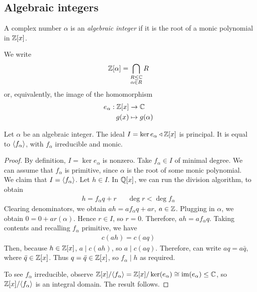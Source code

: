 \documentclass{../template/note}
\begin{document}
    \subsection{Algebraic integers}

    \begin{definition}
        A complex number $\alpha$ is an \emph{algebraic integer} if it is the root of a monic polynomial in $\mathbb Z[x]$.
    \end{definition}
    
    We write
    \begin{align*}
        \mathbb Z[\alpha] = \bigcap_{\substack{R \leq \mathbb C \\ \alpha \in R}} R
    \end{align*}
    or, equivalently, the image of the homomorphism
    \begin{align*}
        e_\alpha: \mathbb Z[x] &\to \mathbb C \\
        g(x) &\mapsto g(\alpha)
    \end{align*}
    
    \begin{proposition}
        Let $\alpha$ be an algebraic integer. The ideal $I = \ker e_\alpha \triangleleft \mathbb Z[x]$ is principal. It is equal to $\left \langle f_\alpha \right \rangle$, with $f_\alpha$ irreducible and monic.
    \end{proposition}
    
    \begin{proof}
        By definition, $I = \ker e_\alpha$ is nonzero. Take $f_\alpha \in I$ of minimal degree. We can assume that $f_\alpha$ is primitive, since $\alpha$ is the root of some monic polynomial. We claim that $I=\left \langle f_\alpha \right \rangle$. Let $h \in I$. In $\mathbb Q[x]$, we can run the division algorithm, to obtain
        \begin{align*}
            h = f_\alpha q + r && \deg r < \deg f_\alpha
        \end{align*}
        Clearing denominators, we obtain $ah = af_\alpha q + ar$, $a \in \mathbb Z$. Plugging in $\alpha$, we obtain $0 = 0 + ar(\alpha)$. Hence $r \in I$, so $r=0$. Therefore, $ah = af_\alpha q$. Taking contents and recalling $f_\alpha$ primitive, we have
        \begin{align*}
            c(ah) = c(aq)
        \end{align*}
        Then, because $h \in \mathbb Z[x]$, $a \mid c(ah)$, so $a \mid c(aq)$. Therefore, can write $aq = a \bar q$, where $\bar q \in \mathbb Z[x]$. Thus $q = \bar q \in \mathbb Z[x]$, so $f_\alpha \mid h$ as required.       
        
        To see $f_\alpha$ irreducible, observe $\mathbb Z[x]/\!\left \langle f_\alpha \right \rangle = \mathbb Z[x]/\ker(e_\alpha) \cong \operatorname{im}(e_\alpha) \leq \mathbb C$, so $\mathbb Z[x]/\!\left \langle f_\alpha \right \rangle$ is an integral domain. The result follows. 
    \end{proof}
    
\end{document}
